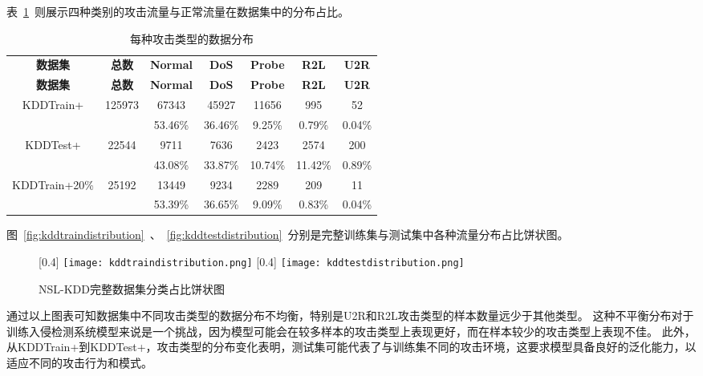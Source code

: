 表~\ref{tab:kdd_distribution}~则展示四种类别的攻击流量与正常流量在数据集中的分布占比。
\begin{table}[h]
	\caption{每种攻击类型的数据分布}
	\label{tab:kdd_distribution}
	\centering
	\begin{tabular}{ccccccc}
		\toprule
		\textbf{数据集}                & \textbf{总数}           & \textbf{Normal} & \textbf{DoS} & \textbf{Probe} & \textbf{R2L} & \textbf{U2R} \\
		\textbf{数据集}                & \textbf{总数}           & \textbf{Normal} & \textbf{DoS} & \textbf{Probe} & \textbf{R2L} & \textbf{U2R} \\
		\midrule
		\multirow{2}{*}{KDDTrain+}     & \multirow{2}{*}{125973} & 67343           & 45927        & 11656          & 995          & 52           \\
		                               &                         & 53.46\%         & 36.46\%      & 9.25\%         & 0.79\%       & 0.04\%       \\
		\multirow{2}{*}{KDDTest+}      & \multirow{2}{*}{22544}  & 9711            & 7636         & 2423           & 2574         & 200          \\
		                               &                         & 43.08\%         & 33.87\%      & 10.74\%        & 11.42\%      & 0.89\%       \\
		\multirow{2}{*}{KDDTrain+20\%} & \multirow{2}{*}{25192}  & 13449           & 9234         & 2289           & 209          & 11           \\
		                               &                         & 53.39\%         & 36.65\%      & 9.09\%         & 0.83\%       & 0.04\%       \\
		\bottomrule
	\end{tabular}
\end{table}
图~\ref{fig:kddtraindistribution}~、~\ref{fig:kddtestdistribution}~分别是完整训练集与测试集中各种流量分布占比饼状图。
\begin{figure}[htbp]
	\centering
	[0.4\textwidth]{
		\texttt{[image: kddtraindistribution.png]}
	}
	\hspace{36pt}
	[0.4\textwidth]{
		\texttt{[image: kddtestdistribution.png]}
	}
	\caption{NSL-KDD完整数据集分类占比饼状图}
\end{figure}

通过以上图表可知数据集中不同攻击类型的数据分布不均衡，特别是U2R和R2L攻击类型的样本数量远少于其他类型。
这种不平衡分布对于训练入侵检测系统模型来说是一个挑战，因为模型可能会在较多样本的攻击类型上表现更好，而在样本较少的攻击类型上表现不佳。
此外，从KDDTrain+到KDDTest+，攻击类型的分布变化表明，测试集可能代表了与训练集不同的攻击环境，这要求模型具备良好的泛化能力，以适应不同的攻击行为和模式。\par

